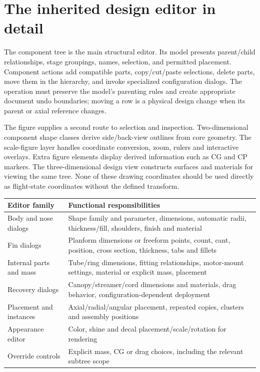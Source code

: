 \section{The inherited design editor in detail}
The component tree is the main structural editor. Its model presents parent/child relationships, stage groupings, names, selection, and permitted placement. Component actions add compatible parts, copy/cut/paste selections, delete parts, move them in the hierarchy, and invoke specialized configuration dialogs. The operation must preserve the model's parenting rules and create appropriate document undo boundaries; moving a row is a physical design change when its parent or axial reference changes.

The figure supplies a second route to selection and inspection. Two-dimensional component shape classes derive side/back-view outlines from core geometry. The scale-figure layer handles coordinate conversion, zoom, rulers and interactive overlays. Extra figure elements display derived information such as CG and CP markers. The three-dimensional design view constructs surfaces and materials for viewing the same tree. None of these drawing coordinates should be used directly as flight-state coordinates without the defined transform.

\begin{tabularx}{\linewidth}{@{}L{3.2cm}Y@{}}\toprule
Editor family & Functional responsibilities\\\midrule
Body and nose dialogs & Shape family and parameter, dimensions, automatic radii, thickness/fill, shoulders, finish and material\\
Fin dialogs & Planform dimensions or freeform points, count, cant, position, cross section, thickness, tabs and fillets\\
Internal parts and mass & Tube/ring dimensions, fitting relationships, motor-mount settings, material or explicit mass, placement\\
Recovery dialogs & Canopy/streamer/cord dimensions and materials, drag behavior, configuration-dependent deployment\\
Placement and instances & Axial/radial/angular placement, repeated copies, clusters and assembly positions\\
Appearance editor & Color, shine and decal placement/scale/rotation for rendering\\
Override controls & Explicit mass, CG or drag choices, including the relevant subtree scope\\\bottomrule
\end{tabularx}

